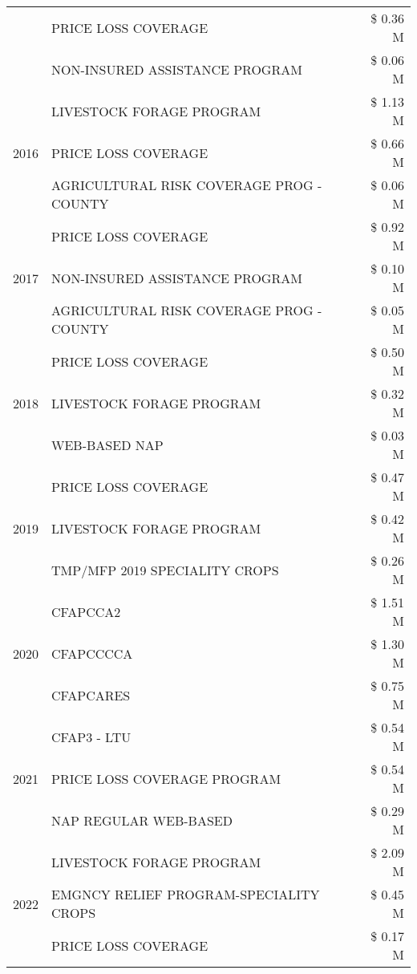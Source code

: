 \begin{tabular}{llr}
 & PRICE LOSS COVERAGE & \$ 0.36 M \\
 & NON-INSURED ASSISTANCE PROGRAM & \$ 0.06 M \\
\cline{1-3}
\multirow[t]{3}{*}{2016} & LIVESTOCK FORAGE PROGRAM & \$ 1.13 M \\
 & PRICE LOSS COVERAGE & \$ 0.66 M \\
 & AGRICULTURAL RISK COVERAGE PROG - COUNTY & \$ 0.06 M \\
\cline{1-3}
\multirow[t]{3}{*}{2017} & PRICE LOSS COVERAGE & \$ 0.92 M \\
 & NON-INSURED ASSISTANCE PROGRAM & \$ 0.10 M \\
 & AGRICULTURAL RISK COVERAGE PROG - COUNTY & \$ 0.05 M \\
\cline{1-3}
\multirow[t]{3}{*}{2018} & PRICE LOSS COVERAGE & \$ 0.50 M \\
 & LIVESTOCK FORAGE PROGRAM & \$ 0.32 M \\
 & WEB-BASED NAP & \$ 0.03 M \\
\cline{1-3}
\multirow[t]{3}{*}{2019} & PRICE LOSS COVERAGE & \$ 0.47 M \\
 & LIVESTOCK FORAGE PROGRAM & \$ 0.42 M \\
 & TMP/MFP 2019 SPECIALITY CROPS & \$ 0.26 M \\
\cline{1-3}
\multirow[t]{3}{*}{2020} & CFAPCCA2 & \$ 1.51 M \\
 & CFAPCCCCA & \$ 1.30 M \\
 & CFAPCARES & \$ 0.75 M \\
\cline{1-3}
\multirow[t]{3}{*}{2021} & CFAP3 - LTU & \$ 0.54 M \\
 & PRICE LOSS COVERAGE PROGRAM & \$ 0.54 M \\
 & NAP REGULAR WEB-BASED & \$ 0.29 M \\
\cline{1-3}
\multirow[t]{3}{*}{2022} & LIVESTOCK FORAGE PROGRAM & \$ 2.09 M \\
 & EMGNCY RELIEF PROGRAM-SPECIALITY CROPS & \$ 0.45 M \\
 & PRICE LOSS COVERAGE & \$ 0.17 M \\
\cline{1-3}
\bottomrule
\end{tabular}
